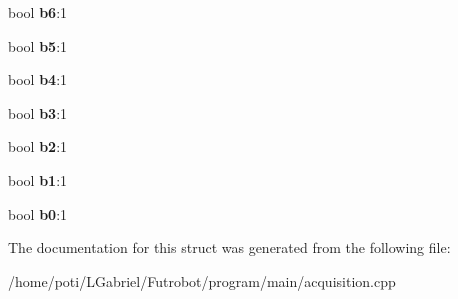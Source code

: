 \begin{DoxyCompactItemize}
\item 
bool {\bfseries b6}\+:1\hypertarget{structBinaryBools_a6fd641e151d13b93a4a77209696365c8}{}\label{structBinaryBools_a6fd641e151d13b93a4a77209696365c8}

\item 
bool {\bfseries b5}\+:1\hypertarget{structBinaryBools_ab1e4b50b66a1185a1a54c098d71c8f44}{}\label{structBinaryBools_ab1e4b50b66a1185a1a54c098d71c8f44}

\item 
bool {\bfseries b4}\+:1\hypertarget{structBinaryBools_a75bc715410fe928901ed528430c3d60c}{}\label{structBinaryBools_a75bc715410fe928901ed528430c3d60c}

\item 
bool {\bfseries b3}\+:1\hypertarget{structBinaryBools_a43353ea3df150e7be4e70582b8faeba6}{}\label{structBinaryBools_a43353ea3df150e7be4e70582b8faeba6}

\item 
bool {\bfseries b2}\+:1\hypertarget{structBinaryBools_a3cd4b09606469acc275e55a136347f01}{}\label{structBinaryBools_a3cd4b09606469acc275e55a136347f01}

\item 
bool {\bfseries b1}\+:1\hypertarget{structBinaryBools_a90c7980a4477dc95f60280a5c1edb0f2}{}\label{structBinaryBools_a90c7980a4477dc95f60280a5c1edb0f2}

\item 
bool {\bfseries b0}\+:1\hypertarget{structBinaryBools_a1d5e1ee0f5314e87e4448e6beac9005f}{}\label{structBinaryBools_a1d5e1ee0f5314e87e4448e6beac9005f}

\end{DoxyCompactItemize}


The documentation for this struct was generated from the following file\+:\begin{DoxyCompactItemize}
\item 
/home/poti/\+L\+Gabriel/\+Futrobot/program/main/acquisition.\+cpp\end{DoxyCompactItemize}
